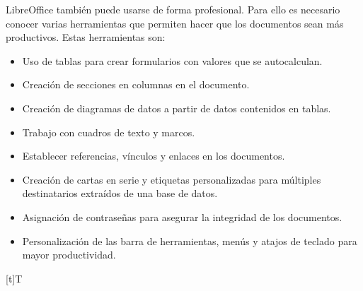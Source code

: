 \documentclass[letterpaper,10pt,spanish]{sphinxmanual}
\let\sphinxpxdimen\pdfpxdimen\else\newdimen\sphinxpxdimen
\begin{document}
\sphinxAtStartPar
LibreOffice también puede usarse de forma profesional. Para ello es necesario conocer varias herramientas que permiten hacer que los documentos sean más productivos. Estas herramientas son:
\begin{itemize}
\item {} 
\sphinxAtStartPar
Uso de tablas para crear formularios con valores que se auto\sphinxhyphen{}calculan.

\item {} 
\sphinxAtStartPar
Creación de secciones en columnas en el documento.

\item {} 
\sphinxAtStartPar
Creación de diagramas de datos a partir de datos contenidos en tablas.

\item {} 
\sphinxAtStartPar
Trabajo con cuadros de texto y marcos.

\item {} 
\sphinxAtStartPar
Establecer referencias, vínculos y enlaces en los documentos.

\item {} 
\sphinxAtStartPar
Creación de cartas en serie y etiquetas personalizadas para múltiples destinatarios extraídos de una base de datos.

\item {} 
\sphinxAtStartPar
Asignación de contraseñas para asegurar la integridad de los documentos.

\item {} 
\sphinxAtStartPar
Personalización de las barra de herramientas, menús y atajos de teclado para mayor productividad.

\end{itemize}


\begin{savenotes}\sphinxattablestart
\sphinxthistablewithglobalstyle
\centering
\begin{tabulary}{\linewidth}[t]{T}
\sphinxtoprule
\sphinxtableatstartofbodyhook

\begin{sphinxfigure-in-table}
\centering
\capstart
\noindent\sphinxincludegraphics[width=600\sphinxpxdimen]{{image034}.png}
\label{\detokenize{1_guias/10ofimatica/G1013:id3}}\end{sphinxfigure-in-table}\relax
\\
\sphinxbottomrule
\end{tabulary}
\sphinxtableafterendhook\par
\sphinxattableend\end{savenotes}
\end{document}

